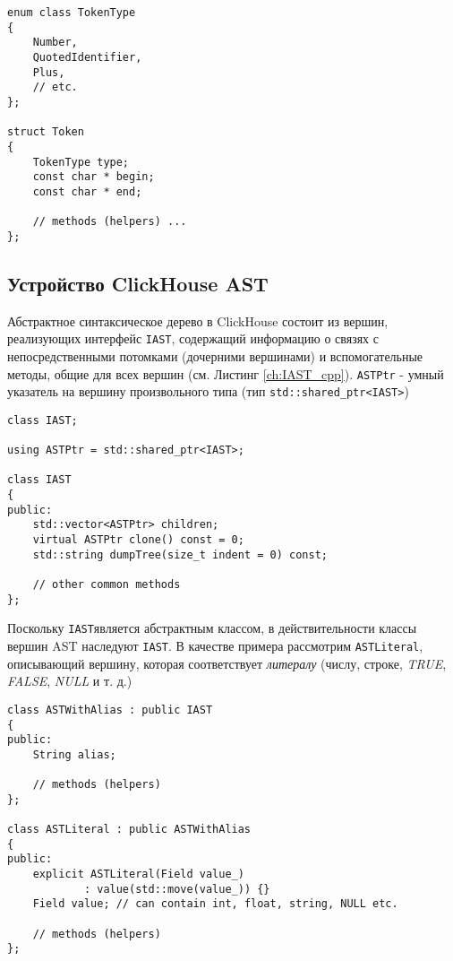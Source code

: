 \begin{lstlisting}[style=customcpp, label={ch:token_cpp}, caption={Структура токена в ClickHouse}, captionpos=b]
enum class TokenType
{
    Number,
    QuotedIdentifier,
    Plus,
    // etc.
};

struct Token
{
    TokenType type;
    const char * begin;
    const char * end;
        
    // methods (helpers) ...
};
\end{lstlisting}

\subsection{Устройство ClickHouse AST}
Абстрактное синтаксическое дерево в ClickHouse состоит из вершин, реализующих интерфейс \lstinline[style=customcpp]|IAST|, содержащий информацию о связях с непосредственными потомками (дочерними вершинами) и вспомогательные методы, общие для всех вершин (см. Листинг \ref{ch:IAST_cpp}). \lstinline[style=customcpp]|ASTPtr| - умный указатель на вершину произвольного типа (тип \lstinline[style=customcpp]|std::shared_ptr<IAST>|)

\begin{lstlisting}[style=customcpp, label={ch:IAST_cpp}, caption={Структура интерфейса IAST}, captionpos=b]
class IAST;

using ASTPtr = std::shared_ptr<IAST>;

class IAST
{
public:
    std::vector<ASTPtr> children;
    virtual ASTPtr clone() const = 0;
    std::string dumpTree(size_t indent = 0) const;
    
    // other common methods
};
\end{lstlisting}

Поскольку \lstinline[style=customcpp]|IAST|является абстрактным классом, в действительности классы вершин AST наследуют \lstinline[style=customcpp]|IAST|. В качестве примера рассмотрим \lstinline[style=customcpp]|ASTLiteral|, описывающий вершину, которая соответствует \textit{литералу} (числу, строке, \textit{TRUE}, \textit{FALSE}, \textit{NULL} и т. д.)

\pagebreak

\begin{lstlisting}[style=customcpp, label={ch:ASTLiteral_cpp}, caption={Наследник интерфейса IAST на примере литерала}, captionpos=b]
class ASTWithAlias : public IAST
{
public:
    String alias;

    // methods (helpers)
};

class ASTLiteral : public ASTWithAlias
{
public:
    explicit ASTLiteral(Field value_) 
            : value(std::move(value_)) {}
    Field value; // can contain int, float, string, NULL etc.

    // methods (helpers)
};
\end{lstlisting}

